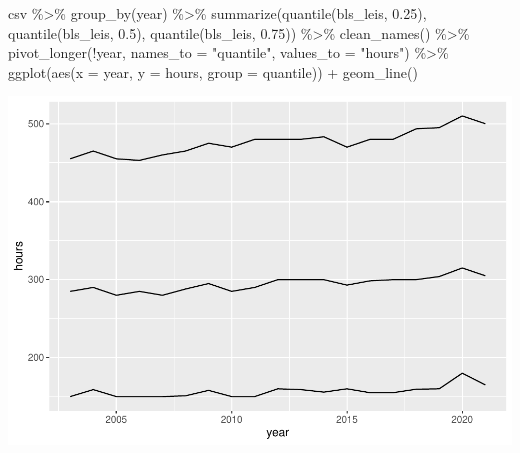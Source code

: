 \documentclass[
]{article}
\newenvironment{Shaded}{\begin{snugshade}}{\end{snugshade}}
\newcommand{\AttributeTok}[1]{\textcolor[rgb]{0.77,0.63,0.00}{#1}}
\newcommand{\FloatTok}[1]{\textcolor[rgb]{0.00,0.00,0.81}{#1}}
\newcommand{\FunctionTok}[1]{\textcolor[rgb]{0.00,0.00,0.00}{#1}}
\newcommand{\NormalTok}[1]{#1}
\newcommand{\SpecialCharTok}[1]{\textcolor[rgb]{0.00,0.00,0.00}{#1}}
\newcommand{\StringTok}[1]{\textcolor[rgb]{0.31,0.60,0.02}{#1}}
\begin{document}
\begin{Shaded}
\begin{Highlighting}[]
\NormalTok{csv }\SpecialCharTok{\%\textgreater{}\%}
  \FunctionTok{group\_by}\NormalTok{(year) }\SpecialCharTok{\%\textgreater{}\%}
  \FunctionTok{summarize}\NormalTok{(}\FunctionTok{quantile}\NormalTok{(bls\_leis, }\FloatTok{0.25}\NormalTok{), }\FunctionTok{quantile}\NormalTok{(bls\_leis, }\FloatTok{0.5}\NormalTok{), }\FunctionTok{quantile}\NormalTok{(bls\_leis, }\FloatTok{0.75}\NormalTok{)) }\SpecialCharTok{\%\textgreater{}\%}
  \FunctionTok{clean\_names}\NormalTok{() }\SpecialCharTok{\%\textgreater{}\%}
  \FunctionTok{pivot\_longer}\NormalTok{(}\SpecialCharTok{!}\NormalTok{year, }\AttributeTok{names\_to =} \StringTok{"quantile"}\NormalTok{, }\AttributeTok{values\_to =} \StringTok{"hours"}\NormalTok{) }\SpecialCharTok{\%\textgreater{}\%}
  \FunctionTok{ggplot}\NormalTok{(}\FunctionTok{aes}\NormalTok{(}\AttributeTok{x =}\NormalTok{ year, }\AttributeTok{y =}\NormalTok{ hours, }\AttributeTok{group =}\NormalTok{ quantile)) }\SpecialCharTok{+}
  \FunctionTok{geom\_line}\NormalTok{()}
\end{Highlighting}
\end{Shaded}

\includegraphics{Paper2_files/figure-latex/graphs-9.pdf}
\end{document}
